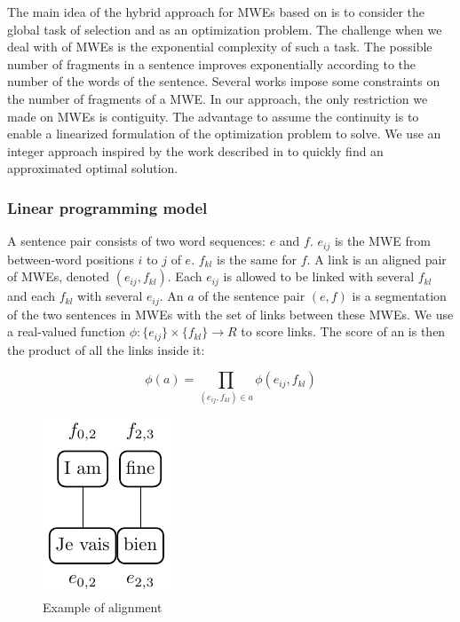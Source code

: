 \documentclass[output=paper,modfonts,nonflat]{langsci/langscibook}
\begin{document}
The main idea of the hybrid approach for MWEs  based on  is to consider the global task of selection and  as an optimization problem. 
The challenge when we deal with  of MWEs is the exponential complexity of such a task. 
The possible number of fragments in a sentence improves exponentially according to the number of the words of the sentence. 
Several works impose some constraints on the number of fragments of a MWE. 
In our approach, the only restriction we made on MWEs is contiguity. The advantage to assume the continuity is to enable a linearized formulation of the optimization problem to solve. We use an integer  approach inspired by the work described in \citet{denero2008complexity} to quickly find an approximated optimal solution.

\subsubsection{Linear programming model}

A sentence pair consists of two word sequences: $e$ and $f$. 
$e_{ij}$ is the MWE from between-word positions $i$ to $j$ of $e$. 
$f_{kl}$ is the same for $f$. 
A link is an aligned pair of MWEs, denoted $(e_{ij},f_{kl})$. 
Each $e_{ij}$ is allowed to be linked with several $f_{kl}$ and each $f_{kl}$ with several $e_{ij}$. 
An  $a$ of the sentence pair $(e,f)$ is a segmentation of the two sentences in MWEs with the set of links between these MWEs.
We use a real-valued function $\phi:\{e_{ij}\}\times\{f_{kl}\}\rightarrow R$ to score links. 
The score of an  is then the product of all the links inside it:

\begin{equation}
\phi(a)=\prod_{(e_{ij},f_{kl})\in a} \phi(e_{ij},f_{kl})
\end{equation}

\begin{figure}
  \includegraphics[scale=1.]{figures/figExSem}
\caption{\label{sem:fig:aliEx}Example of alignment}
\end{figure}
\end{document}

